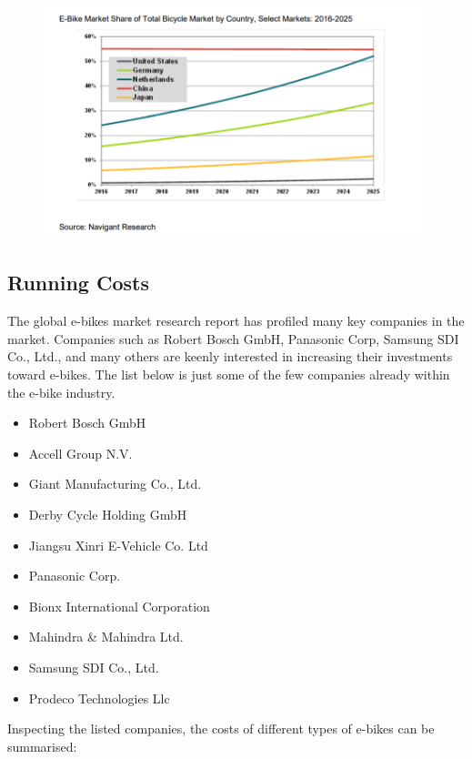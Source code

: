 \documentclass[a4paper,11pt]{article}
\begin{document}
\begin{figure}[!ht]
	\centering
	\includegraphics[width=0.98\textwidth]{ebmarketshare}
\end{figure}

\newpage

\subsection{Running Costs}

The global e-bikes market research report has profiled many key companies in the market. Companies such as Robert Bosch GmbH, Panasonic Corp, Samsung SDI Co., Ltd., and many others are keenly interested in increasing their investments toward e-bikes. The list below is just some of the few companies already within the e-bike industry.

\begin{itemize}
	\setlength{\itemsep}{0pt}
	\item Robert Bosch GmbH
	\item Accell Group N.V.
	\item Giant Manufacturing Co., Ltd.
	\item Derby Cycle Holding GmbH
	\item Jiangsu Xinri E-Vehicle Co. Ltd
	\item Panasonic Corp.
	\item Bionx International Corporation
	\item Mahindra \& Mahindra Ltd.
	\item Samsung SDI Co., Ltd.
	\item Prodeco Technologies Llc
\end{itemize}

Inspecting the listed companies, the costs of different types of e-bikes can be summarised:
\end{document}
